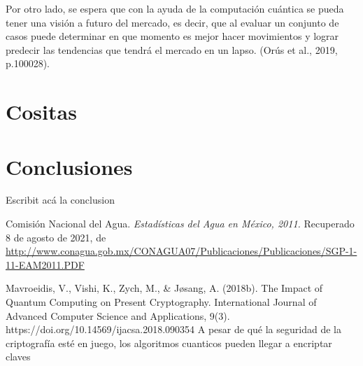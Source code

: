 \documentclass{article}
\begin{document}
Por otro lado, se espera que con la ayuda de la computación cuántica se pueda tener una visión a futuro del mercado, es decir, que al evaluar un conjunto de casos puede determinar en que momento es mejor hacer movimientos y lograr predecir las tendencias que tendrá el mercado en un lapso. (Orús et al., 2019, p.100028).






\section{Cositas}




\section{Conclusiones}
\vspace{1cm}
Escribit acá la conclusion



\clearpage
\begin{thebibliography}{99}

Comisión Nacional del Agua.
\textit{Estadísticas del Agua en México, 2011.} Recuperado 8 de agosto de 2021, de \url{http://www.conagua.gob.mx/CONAGUA07/Publicaciones/Publicaciones/SGP-1-11-EAM2011.PDF}

Mavroeidis, V., Vishi, K., Zych, M., & Jøsang, A. (2018b). The Impact of Quantum Computing on Present Cryptography. International Journal of Advanced Computer Science and Applications, 9(3). https://doi.org/10.14569/ijacsa.2018.090354
A pesar de qué la seguridad de la criptografía esté en juego, los algoritmos cuanticos pueden llegar a encriptar claves 




\end{thebibliography}
\end{document}
